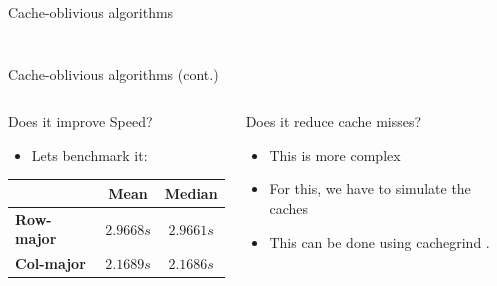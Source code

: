 \documentclass[compress,aspectratio=169]{beamer}
\begin{document}
\begin{frame}{Cache-oblivious algorithms \cite{frigo}}
\begin{columns}
\begin{column}{0.5\textwidth}
      \cite{cmglee}
    \end{column}
  \end{columns}
\end{frame}

\begin{frame}{Cache-oblivious algorithms (cont.)}
  \begin{columns}
    \begin{column}{0.5\textwidth}
      \begin{block}{Does it improve Speed?}
        \begin{itemize}
          \item Lets benchmark it:
        \end{itemize}
  \begin{table}[h]
\begin{tabular}{|l|c|c|}
\hline
    & \textbf{Mean} & \textbf{Median}\\
\hline
    \textbf{Row-major} & $2.9668s$ & $2.9661 s$\\
  \hline
    \textbf{Col-major} & $2.1689 s$ & $2.1686 s$\\
\hline
\end{tabular}
\end{table}
      \end{block}
    \end{column}
    \pause
    \begin{column}{0.5\textwidth}
      \begin{block}{Does it reduce cache misses?}
        \begin{itemize}
          \item This is more complex
          \item For this, we have to simulate the caches
          \item This can be done using cachegrind \cite{valgrind}.
        \end{itemize}
      \end{block}
    \end{column}
  \end{columns}
\end{frame}
\end{document}
